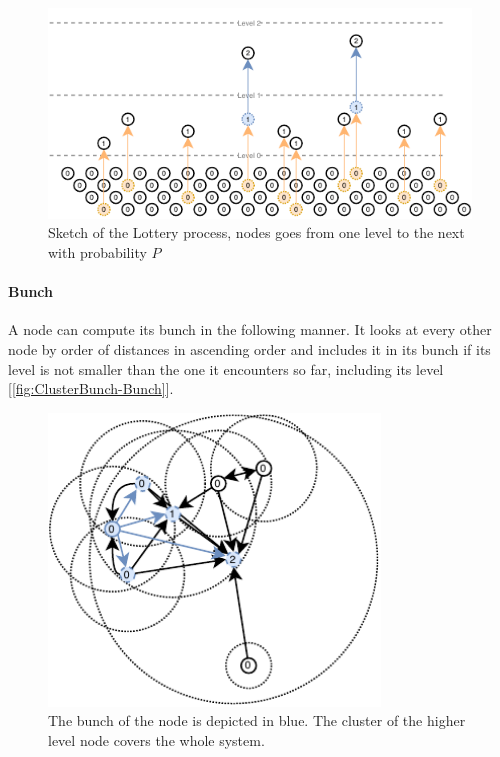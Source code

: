 \documentclass[a4paper,11pt,oneside]{report}
\begin{document}
\begin{figure}[!h] 
\centering
\includegraphics[width=400pt]{figures/Lottery-Standard}
\caption{Sketch of the Lottery process, nodes goes from one level to the next
  with probability $P$} \label{fig:ClusterBunch-Bunch}
\end{figure}

\paragraph{Bunch} A node can compute its bunch in the following manner. It
looks at every other node by order of distances in ascending order and
includes it in its bunch if its level is not smaller than the one it encounters
so far, including its level [\autoref{fig:ClusterBunch-Bunch}]. 

\begin{figure}[!h] 
\centering
\includegraphics[width=250pt]{figures/ClusterBunch-Bunch}
\caption{ The bunch of the node is depicted in blue. The cluster of the higher
  level node covers the whole system. } \label{fig:ClusterBunch-Bunch}
\end{figure}
\end{document}

